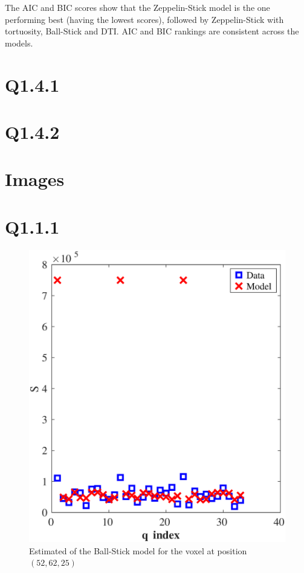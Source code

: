 \documentclass[11pt,a4paper,oneside]{report}
\begin{document}
The AIC and BIC scores show that the Zeppelin-Stick model is the one performing best (having the lowest scores), followed by Zeppelin-Stick with tortuosity, Ball-Stick and DTI. AIC and BIC rankings are consistent across the models. 


\section*{Q1.4.1}

\section*{Q1.4.2}



\section*{Images}

\section*{Q1.1.1}

\begin{figure}[H]
\centering
\includegraphics[scale=0.5]{figures/q1/q111.eps}
\caption{Estimated of the Ball-Stick model for the voxel at position $(52,62,25)$}
\label{q111}
\end{figure}
\end{document}
